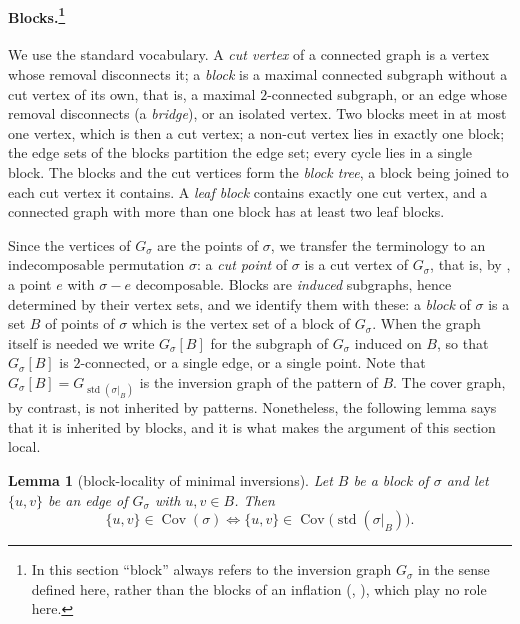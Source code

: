 \documentclass[12pt]{article}
\newtheorem{lemma}[lemma]{Lemma}
\theoremstyle{definition}
\newcommand{\std}{\operatorname{std}}
\newcommand{\Cov}{\operatorname{Cov}}  %
\newcommand{\igr}{G}                      %
\begin{document}
\paragraph{Blocks.\protect\footnote{In this section ``block'' always refers to the
inversion graph $\igr_\sigma$ in the sense defined here, rather than the blocks
of an inflation (, ), which play no role here.}}
We use the standard vocabulary. A \emph{cut vertex} of a connected graph
is a vertex whose removal disconnects it; a \emph{block} is a maximal
connected subgraph without a cut vertex of its own, that is, a maximal
$2$-connected subgraph, or an edge whose removal disconnects (a
\emph{bridge}), or an isolated vertex. Two blocks meet in at most one
vertex, which is then a cut vertex; a non-cut vertex lies in exactly one
block; the edge sets of the blocks partition the edge set; every cycle
lies in a single block. The blocks and the cut vertices form the
\emph{block tree}, a block being joined to each cut vertex it contains. A
\emph{leaf block} contains exactly one cut vertex, and a connected graph
with more than one block has at least two leaf blocks.

Since the vertices of $\igr_\sigma$ are the points of $\sigma$, we transfer
the terminology to an indecomposable permutation $\sigma$: a \emph{cut point}
of $\sigma$ is a cut vertex of $\igr_\sigma$, that is, by
, a point $e$ with $\sigma - e$
decomposable. Blocks are \emph{induced} subgraphs, hence determined by
their vertex sets, and we identify them with these: a \emph{block} of
$\sigma$ is a set $B$ of points of $\sigma$ which is the vertex set of a
block of $\igr_\sigma$. When the graph itself is needed we write
$\igr_\sigma[B]$ for the subgraph of $\igr_\sigma$ induced on $B$, so that
$\igr_\sigma[B]$ is $2$-connected, or a single edge, or a single point. Note
that $\igr_\sigma[B] = \igr_{\std(\sigma|_B)}$ is the inversion graph of the
pattern of $B$. The cover graph, by contrast, is not inherited by patterns.
Nonetheless, the following lemma says that it is inherited by blocks, and it is what makes the argument of this
section local.

\begin{lemma}[block-locality of minimal inversions]\label{lem:blockloc}
Let $B$ be a block of $\sigma$ and let $\{u,v\}$ be an edge of
$\igr_\sigma$ with $u,v \in B$. Then
\[
   \{u,v\} \in \Cov(\sigma)
   \iff
   \{u,v\} \in \Cov\bigl(\std(\sigma|_B)\bigr) .
\]
\end{lemma}
\end{document}

